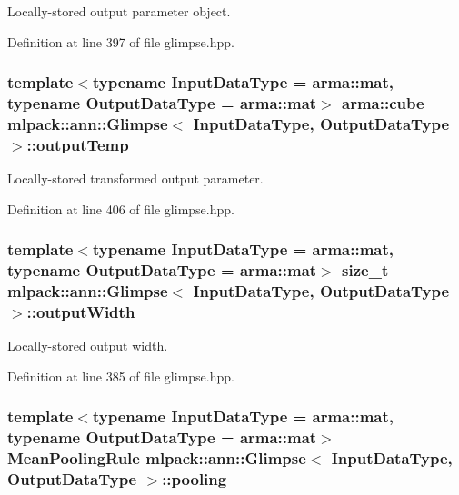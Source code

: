 Locally-\/stored output parameter object. 



Definition at line 397 of file glimpse.\+hpp.

\subsubsection[{output\+Temp}]{\setlength{\rightskip}{0pt plus 5cm}template$<$typename Input\+Data\+Type  = arma\+::mat, typename Output\+Data\+Type  = arma\+::mat$>$ arma\+::cube {\bf mlpack\+::ann\+::\+Glimpse}$<$ Input\+Data\+Type, Output\+Data\+Type $>$\+::output\+Temp\hspace{0.3cm}{\ttfamily [private]}}\label{classmlpack_1_1ann_1_1Glimpse_a57418f7588307c036fa0642c174235f6}


Locally-\/stored transformed output parameter. 



Definition at line 406 of file glimpse.\+hpp.

\subsubsection[{output\+Width}]{\setlength{\rightskip}{0pt plus 5cm}template$<$typename Input\+Data\+Type  = arma\+::mat, typename Output\+Data\+Type  = arma\+::mat$>$ size\+\_\+t {\bf mlpack\+::ann\+::\+Glimpse}$<$ Input\+Data\+Type, Output\+Data\+Type $>$\+::output\+Width\hspace{0.3cm}{\ttfamily [private]}}\label{classmlpack_1_1ann_1_1Glimpse_ae853c598559847e0e92f902239969e3e}


Locally-\/stored output width. 



Definition at line 385 of file glimpse.\+hpp.

\subsubsection[{pooling}]{\setlength{\rightskip}{0pt plus 5cm}template$<$typename Input\+Data\+Type  = arma\+::mat, typename Output\+Data\+Type  = arma\+::mat$>$ {\bf Mean\+Pooling\+Rule} {\bf mlpack\+::ann\+::\+Glimpse}$<$ Input\+Data\+Type, Output\+Data\+Type $>$\+::pooling\hspace{0.3cm}{\ttfamily [private]}}\label{classmlpack_1_1ann_1_1Glimpse_aed172319995d65b61be45274a3826202}


